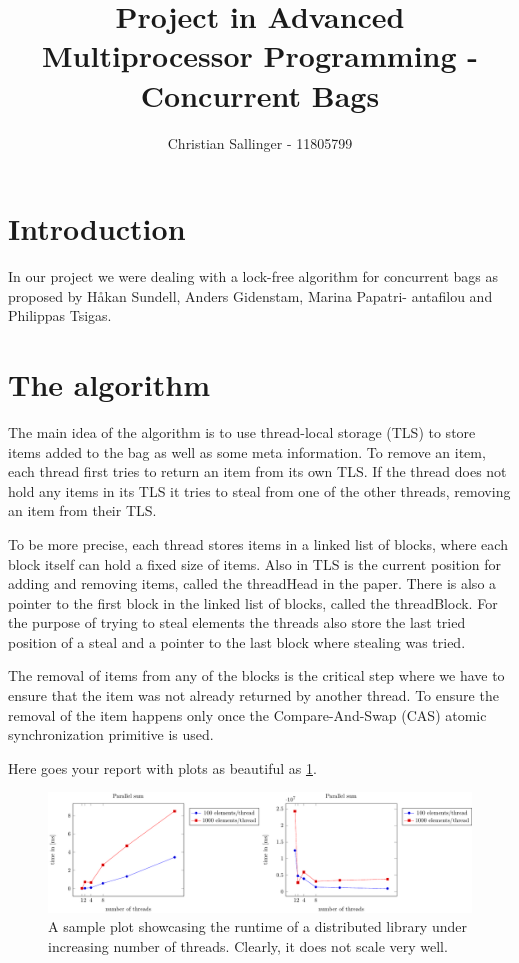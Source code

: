 \documentclass{article}
\begin{document}
\title{Project in Advanced Multiprocessor Programming - Concurrent Bags}
\author{Christian Sallinger - 11805799}
\maketitle

\section{Introduction}

In our project we were dealing with a lock-free algorithm for concurrent bags as proposed by Håkan Sundell, Anders Gidenstam, Marina Papatri-
antafilou and Philippas Tsigas. 


\section{The algorithm}

The main idea of the algorithm is to use thread-local storage (TLS) to store items added to the bag as well as some meta information.
To remove an item, each thread first tries to return an item from its own TLS. If the thread does not hold any items in its TLS it tries to steal
from one of the other threads, removing an item from their TLS.

To be more precise, each thread stores items in a linked list of blocks, where each block itself can hold a fixed size of items. Also in TLS is the current position
for adding and removing items, called the threadHead in the paper. There is also a pointer to the first block in the linked list of blocks, called the threadBlock. For the 
purpose of trying to steal elements the threads also store the last tried position of a steal and a pointer to the last block where stealing was tried.

The removal of items from any of the blocks is the critical step where we have to ensure that the item was not already returned by another thread. To ensure the removal of the item
happens only once the Compare-And-Swap (CAS) atomic synchronization primitive is used.


Here goes your report with plots as beautiful as \cref{fig:example_plot}.

\begin{figure}[ht!]
  \centering
  \includegraphics[width = \textwidth]{../plots/avg_plot.pdf}
  \caption{A sample plot showcasing the runtime of a distributed library under
  increasing number of threads. Clearly, it does not scale very well.}
  \label{fig:example_plot}
\end{figure}
\end{document}
